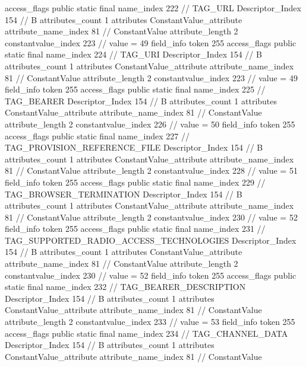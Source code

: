 {{{{{				access_flags	public static final
				name_index	222		// TAG_URL
				Descriptor_Index	154		// B
				attributes_count	1
				attributes {
				ConstantValue_attribute {
					attribute_name_index	81		// ConstantValue
					attribute_length	2
					constantvalue_index	223		// value = 49
				}
				}
			}
			field_info {
				token	255
				access_flags	public static final
				name_index	224		// TAG_URI
				Descriptor_Index	154		// B
				attributes_count	1
				attributes {
				ConstantValue_attribute {
					attribute_name_index	81		// ConstantValue
					attribute_length	2
					constantvalue_index	223		// value = 49
				}
				}
			}
			field_info {
				token	255
				access_flags	public static final
				name_index	225		// TAG_BEARER
				Descriptor_Index	154		// B
				attributes_count	1
				attributes {
				ConstantValue_attribute {
					attribute_name_index	81		// ConstantValue
					attribute_length	2
					constantvalue_index	226		// value = 50
				}
				}
			}
			field_info {
				token	255
				access_flags	public static final
				name_index	227		// TAG_PROVISION_REFERENCE_FILE
				Descriptor_Index	154		// B
				attributes_count	1
				attributes {
				ConstantValue_attribute {
					attribute_name_index	81		// ConstantValue
					attribute_length	2
					constantvalue_index	228		// value = 51
				}
				}
			}
			field_info {
				token	255
				access_flags	public static final
				name_index	229		// TAG_BROWSER_TERMINATION
				Descriptor_Index	154		// B
				attributes_count	1
				attributes {
				ConstantValue_attribute {
					attribute_name_index	81		// ConstantValue
					attribute_length	2
					constantvalue_index	230		// value = 52
				}
				}
			}
			field_info {
				token	255
				access_flags	public static final
				name_index	231		// TAG_SUPPORTED_RADIO_ACCESS_TECHNOLOGIES
				Descriptor_Index	154		// B
				attributes_count	1
				attributes {
				ConstantValue_attribute {
					attribute_name_index	81		// ConstantValue
					attribute_length	2
					constantvalue_index	230		// value = 52
				}
				}
			}
			field_info {
				token	255
				access_flags	public static final
				name_index	232		// TAG_BEARER_DESCRIPTION
				Descriptor_Index	154		// B
				attributes_count	1
				attributes {
				ConstantValue_attribute {
					attribute_name_index	81		// ConstantValue
					attribute_length	2
					constantvalue_index	233		// value = 53
				}
				}
			}
			field_info {
				token	255
				access_flags	public static final
				name_index	234		// TAG_CHANNEL_DATA
				Descriptor_Index	154		// B
				attributes_count	1
				attributes {
				ConstantValue_attribute {
					attribute_name_index	81		// ConstantValue
}}}}}}}
